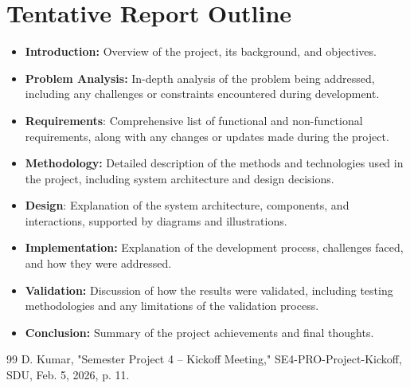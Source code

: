 \documentclass[12pt, a4paper]{article}
\begin{document}
\section{Tentative Report Outline}
\begin{itemize}
    \item \textbf{Introduction:} Overview of the project, its background, and objectives.
    \item \textbf{Problem Analysis:} In-depth analysis of the problem being addressed, including any challenges or constraints encountered during development.
    \item \textbf{Requirements}: Comprehensive list of functional and non-functional requirements, along with any changes or updates made during the project.
    \item \textbf{Methodology:} Detailed description of the methods and technologies used in the project, including system architecture and design decisions.
    \item \textbf{Design}: Explanation of the system architecture, components, and interactions, supported by diagrams and illustrations.
    \item \textbf{Implementation:} Explanation of the development process, challenges faced, and how they were addressed.
    \item \textbf{Validation:} Discussion of how the results were validated, including testing methodologies and any limitations of the validation process.
    \item \textbf{Conclusion:} Summary of the project achievements and final thoughts.
\end{itemize}

\begin{thebibliography}{99}
     D. Kumar, "Semester Project 4 – Kickoff Meeting," SE4-PRO-Project-Kickoff, SDU, Feb. 5, 2026, p. 11.
\end{thebibliography}
\end{document}
